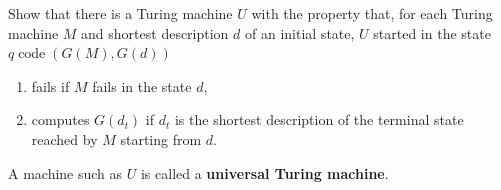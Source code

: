 Show that there is a Turing machine $U$ with the property that, for each Turing machine $M$ and shortest description $d$ of an initial state, $U$ started in the state $q \operatorname{code}(G(M), G(d))$

\begin{enumerate}
\item[(i)] fails if $M$ fails in the state $d$,
\item[(ii)] computes $G(d_t)$ if $d_t$ is the shortest description of the terminal state reached by $M$ starting from $d$.
\end{enumerate}

A machine such as $U$ is called a \textbf{universal Turing machine}.
